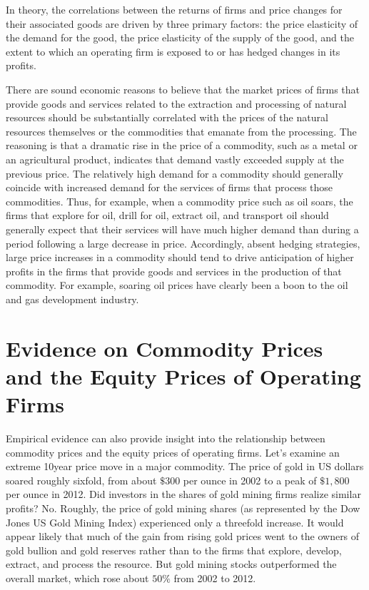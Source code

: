 \documentclass[11pt]{article}
\begin{document}
In theory, the correlations between the returns of firms and price changes for their associated goods are driven by three primary factors: the price elasticity of the demand for the good, the price elasticity of the supply of the good, and the extent to which an operating firm is exposed to or has hedged changes in its profits.

There are sound economic reasons to believe that the market prices of firms that provide goods and services related to the extraction and processing of natural resources should be substantially correlated with the prices of the natural resources themselves or the commodities that emanate from the processing. The reasoning is that a dramatic rise in the price of a commodity, such as a metal or an agricultural product, indicates that demand vastly exceeded supply at the previous price. The relatively high demand for a commodity should generally coincide with increased demand for the services of firms that process those commodities. Thus, for example, when a commodity price such as oil soars, the firms that explore for oil, drill for oil, extract oil, and transport oil should generally expect that their services will have much higher demand than during a period following a large decrease in price. Accordingly, absent hedging strategies, large price increases in a commodity should tend to drive anticipation of higher profits in the firms that provide goods and services in the production of that commodity. For example, soaring oil prices have clearly been a boon to the oil and gas development industry.

\section*{Evidence on Commodity Prices and the Equity Prices of Operating Firms}
Empirical evidence can also provide insight into the relationship between commodity prices and the equity prices of operating firms. Let's examine an extreme 10year price move in a major commodity. The price of gold in US dollars soared roughly sixfold, from about $\$ 300$ per ounce in 2002 to a peak of $\$ 1,800$ per ounce in 2012. Did investors in the shares of gold mining firms realize similar profits? No. Roughly, the price of gold mining shares (as represented by the Dow Jones US Gold Mining Index) experienced only a threefold increase. It would appear likely that much of the gain from rising gold prices went to the owners of gold bullion and gold reserves rather than to the firms that explore, develop, extract, and process the resource. But gold mining stocks outperformed the overall market, which rose about $50 \%$ from 2002 to 2012.
\end{document}
